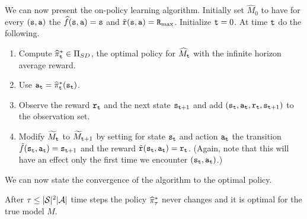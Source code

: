 We can now present the on-policy learning algorithm.
%
Initially set $\widehat{M}_0$ to have for every $({\tt s},{\tt a})$
the $\widehat{f}({\tt s},{\tt a})={\tt s}$ and
$\tilde{{\tt r}}({\tt s},{\tt a})={\tt R}_{\max }$. Initialize ${\tt t}=0$. At
time ${\tt t}$ do the following.
\begin{enumerate}
\item
Compute $\widehat{\pi}^*_{\tt t}\in \Pi_{SD}$, the optimal policy for
$\widehat{M}_{\tt t}$ with the infinite horizon average reward.
\item
Use ${\tt a}_{\tt t}=\widehat{\pi}^*_{\tt t}({\tt s}_{{\tt t}})$.
\item
Observe the reward ${\tt r}_{\tt t}$ and the next state
${\tt s}_{{\tt t}+1}$ and add
$({\tt s}_{\tt t},{\tt a}_{\tt t},{\tt r}_{\tt t},{\tt s}_{{\tt t}+1})$ to
the observation set.
\item
Modify $\widetilde{M}_{\tt t}$ to  $\widetilde{M}_{{\tt t}+1}$
by setting for state ${\tt s}_{\tt t}$ and action ${\tt a}_{\tt t}$ the
transition $\tilde{f}({\tt s}_{\tt t},{\tt a}_{\tt t})={\tt s}_{{\tt t}+1}$
and the reward
$\tilde{{\tt r}}({\tt s}_{\tt t},{\tt a}_{\tt t})={\tt r}_{\tt t}$.
(Again, note that this will have an effect only the first time we
encounter $({\tt s}_{\tt t},{\tt a}_{\tt t})$.)
%
\end{enumerate}





We can now state the convergence of the algorithm to the optimal
policy.

\begin{theorem}
After $\tau\leq|\mathcal{S}|^2|\mathcal{A}|$ time steps the policy
$\widehat{\pi}^*_\tau$ never changes and it is optimal for the true model $M$.
\end{theorem}


